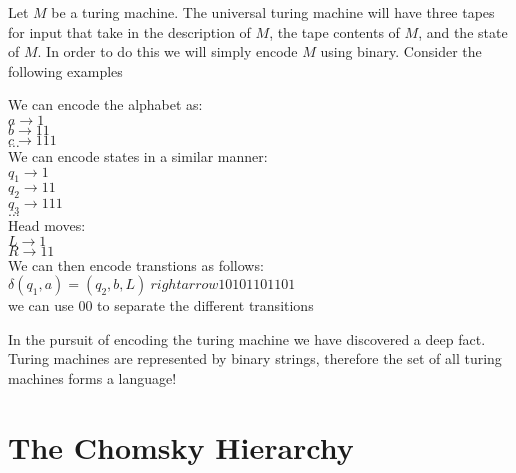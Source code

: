 \documentclass[11pt]{exam}
\begin{document}
Let $M$ be a turing machine. The universal turing machine will have three tapes for input that take in the description of $M$, the tape contents of $M$, and the state of $M$. In order to do this we will simply encode $M$ using binary. Consider the following examples
\begin{center}
We can encode the alphabet as:\\
$a \rightarrow 1$\\
$b \rightarrow 11$\\
$c \rightarrow 111$\\
$\dots$\\

We can encode states in a similar manner:\\
$q_1 \rightarrow 1$\\
$q_2 \rightarrow 11$\\
$q_3 \rightarrow 111$\\
$\dots$\\

Head moves:\\
$L \rightarrow 1$\\
$R \rightarrow 11$\\

We can then encode transtions as follows:\\
$\delta(q_1,a) = (q_2,b,L) \ rightarrow 10101101101$\\
we can use 00 to separate the different transitions
\end{center}

In the pursuit of encoding the turing machine we have discovered a deep fact. Turing machines are represented by binary strings, therefore the set of all turing machines forms a language!

\newpage 

\section{The Chomsky Hierarchy}
\end{document}
